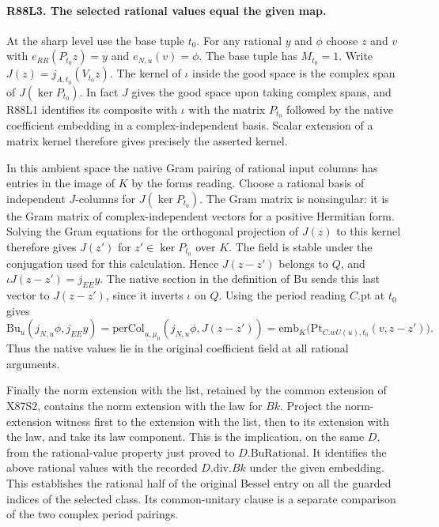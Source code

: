 \paragraph{R88L3. The selected rational values equal the given map.}
At the sharp level use the base tuple $t_0$. For any rational
$y$ and $\phi$ choose $z$ and $v$ with $e_{RR}(P_{t_0}z)=y$ and
$e_{N,u}(v)=\phi$. The base tuple has $M_{t_0}=1$.
Write $J(z)=j_{A,t_0}(V_{t_0}z)$. The kernel of $\iota$ inside
the good space is the complex span of $J(\ker P_{t_0})$.
In fact $J$ gives the good space upon taking complex spans, and
R88L1 identifies its composite with $\iota$ with the matrix
$P_{t_0}$ followed by the native coefficient embedding in a
complex-independent basis. Scalar extension of a matrix kernel
therefore gives precisely the asserted kernel.

In this ambient space the native Gram pairing of rational input
columns has entries in the image of $K$ by the forms reading.
Choose a rational basis of independent $J$-columns for
$J(\ker P_{t_0})$. The Gram matrix is nonsingular:
it is the Gram matrix of complex-independent vectors for a positive
Hermitian form. Solving the Gram equations for the orthogonal
projection of $J(z)$ to this kernel therefore gives $J(z')$ for
$z'\in\ker P_{t_0}$ over $K$. The field is stable under the
conjugation used for this calculation. Hence $J(z-z')$ belongs to
$Q$, and $\iota J(z-z')=j_{EE}y$.
The native section in the definition of $\mathrm{Bu}$ sends this
last vector to $J(z-z')$, since it inverts $\iota$ on $Q$.
Using the period reading $C.\mathrm{pt}$ at $t_0$ gives
\[
 \mathrm{Bu}_u(j_{N,u}\phi,j_{EE}y)
   =\mathrm{perCol}_{u,\mu_0}(j_{N,u}\phi,J(z-z'))
   =\mathrm{emb}_K\bigl(\mathrm{Pt}_{C.wU(u),t_0}(v,z-z')\bigr).
\]
Thus the native values lie in the original coefficient field at
all rational arguments.

Finally the norm extension with the list, retained by the common
extension of X87S2, contains the norm extension with the law for
$Bk$. Project the norm-extension witness first to the extension with
the list, then to its extension with the law, and take its law
component. This is the implication, on the same $D$, from the
rational-value property just proved to $D.\mathrm{BuRational}$.
It identifies the above rational values with the recorded
$D.\mathrm{div}.Bk$ under the given embedding. This establishes
the rational half of the original Bessel entry on all the guarded
indices of the selected class. Its common-unitary clause is a
separate comparison of the two complex period pairings.
